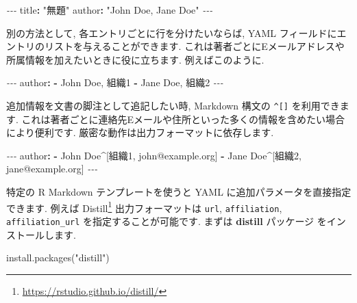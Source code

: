 \documentclass[
  11pt,
  lualatex,ja=standard,jafont=noto]{bxjsreport}
\newenvironment{Shaded}{\begin{snugshade}}{\end{snugshade}}
\newcommand{\AttributeTok}[1]{\textcolor[rgb]{0.77,0.63,0.00}{#1}}
\newcommand{\FunctionTok}[1]{\textcolor[rgb]{0.00,0.00,0.00}{#1}}
\newcommand{\KeywordTok}[1]{\textcolor[rgb]{0.13,0.29,0.53}{\textbf{#1}}}
\newcommand{\NormalTok}[1]{#1}
\newcommand{\PreprocessorTok}[1]{\textcolor[rgb]{0.56,0.35,0.01}{\textit{#1}}}
\newcommand{\StringTok}[1]{\textcolor[rgb]{0.31,0.60,0.02}{#1}}
\renewcommand{\href}[2]{#2\footnote{\url{#1}}}
\begin{document}
\begin{Shaded}
\begin{Highlighting}[]
\PreprocessorTok{{-}{-}{-}}
\FunctionTok{title}\KeywordTok{:}\AttributeTok{ }\StringTok{"無題"}
\FunctionTok{author}\KeywordTok{:}\AttributeTok{ }\StringTok{"John Doe, Jane Doe"}
\PreprocessorTok{{-}{-}{-}}
\end{Highlighting}
\end{Shaded}

別の方法として, 各エントリごとに行を分けたいならば, YAML フィールドにエントリのリストを与えることができます. これは著者ごとにEメールアドレスや所属情報を加えたいときに役に立ちます. 例えばこのように.

\begin{Shaded}
\begin{Highlighting}[]
\PreprocessorTok{{-}{-}{-}}
\FunctionTok{author}\KeywordTok{:}
\AttributeTok{  }\KeywordTok{{-}}\AttributeTok{ John Doe, 組織1}
\AttributeTok{  }\KeywordTok{{-}}\AttributeTok{ Jane Doe, 組織2}
\PreprocessorTok{{-}{-}{-}}
\end{Highlighting}
\end{Shaded}

追加情報を文書の脚注として追記したい時, Markdown 構文の \texttt{\^{}{[}{]}} を利用できます. これは著者ごとに連絡先Eメールや住所といった多くの情報を含めたい場合により便利です. 厳密な動作は出力フォーマットに依存します.

\begin{Shaded}
\begin{Highlighting}[]
\PreprocessorTok{{-}{-}{-}}
\FunctionTok{author}\KeywordTok{:}
\AttributeTok{  }\KeywordTok{{-}}\AttributeTok{ John Doe\^{}[組織1, john@example.org]}
\AttributeTok{  }\KeywordTok{{-}}\AttributeTok{ Jane Doe\^{}[組織2, jane@example.org]}
\PreprocessorTok{{-}{-}{-}}
\end{Highlighting}
\end{Shaded}

特定の R Markdown テンプレートを使うと YAML に追加パラメータを直接指定できます. 例えば \href{https://rstudio.github.io/distill/}{Distill} 出力フォーマットは \texttt{url}, \texttt{affiliation}, \texttt{affiliation\_url} を指定することが可能です. まずは \textbf{distill} パッケージ \autocite{R-distill} をインストールします.

\begin{Shaded}
\begin{Highlighting}[numbers=left,,]
\FunctionTok{install.packages}\NormalTok{(}\StringTok{"distill"}\NormalTok{)}
\end{Highlighting}
\end{Shaded}
\end{document}
